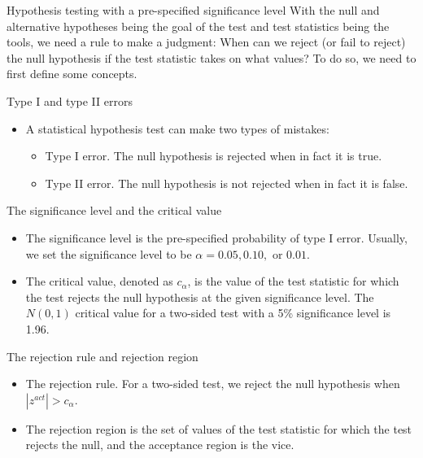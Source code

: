 \documentclass[presentation]{beamer}
\begin{document}
\begin{frame}[label={sec:org2a4cd8c}]{Hypothesis testing with a pre-specified significance level}
With the null and alternative hypotheses being the goal of the test
and test statistics being the tools, we need a rule to make a
judgment: When can we reject (or fail to reject) the null hypothesis
if the test statistic takes on what values? To do so, we need to first
define some concepts. 
\end{frame}


\begin{frame}[label={sec:org1e61630}]{Type I and type II errors}
\begin{itemize}
\item A statistical hypothesis test can make two types of mistakes:
\begin{itemize}
\item \alert{Type I error}. The null hypothesis is rejected when in fact it is
true.
\item \alert{Type II error}. The null hypothesis is not rejected when in fact it
is false.
\end{itemize}
\end{itemize}
\end{frame}

\begin{frame}[label={sec:orge57aae4}]{The significance level and the critical value}
\begin{itemize}
\item The \alert{significance level} is the pre-specified probability of type I error.
Usually, we set the significance level to be \(\alpha = 0.05, 0.10,
  \text{ or } 0.01\).

\item The \alert{critical value}, denoted as \(c_{\alpha}\), is the value of the
test statistic for which the test rejects the null hypothesis at the
given significance level. The \(N(0, 1)\) critical value for a
two-sided test with a 5\% significance level is 1.96.
\end{itemize}
\end{frame}

\begin{frame}[label={sec:org0275c53}]{The rejection rule and rejection region}
\begin{itemize}
\item The \alert{rejection rule}. For a two-sided test, we reject the null
hypothesis when \(|z^{act}| > c_{\alpha}\).

\item The \alert{rejection region} is the set of values of the test statistic
for which the test rejects the null, and the \alert{acceptance region} is
the vice.
\end{itemize}
\end{frame}
\end{document}
